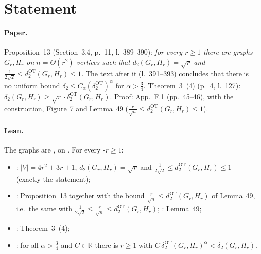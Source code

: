 

\paperversion

\section{Statement}

\paragraph{Paper.} Proposition~13 (Section~3.4, p.~11, l.~389--390): \emph{for every $r\ge1$ there are graphs
$G_r,H_r$ on $n=\Theta(r^2)$ vertices such that $d_2(G_r,H_r)=\sqrt r$ and
$\frac1{2\sqrt2}\le d^{\mathrm{OT}}_2(G_r,H_r)\le1$.} The text after it (l.~391--393) concludes that there is no
uniform bound $\delta_2\le C_\alpha(\delta^{\mathrm{OT}}_2)^\alpha$ for $\alpha>\frac34$. Theorem~3~(4) (p.~4,
l.~127): $\delta_2(G_r,H_r)\ge\sqrt r\cdot\delta^{\mathrm{OT}}_2(G_r,H_r)$. Proof: App.~F.1 (pp.~45--46), with the
construction, Figure~7 and Lemma~49 ($\frac r{\sqrt n}\le d^{\mathrm{OT}}_2(G_r,H_r)\le1$).

\paragraph{Lean.} The graphs are ,  on . For every
\hyp{$r\ge1$}:
\begin{itemize}
\item {}: $|V|=4r^2+3r+1$, $d_2(G_r,H_r)=\sqrt r$ and $\frac1{2\sqrt2}\le d^{\mathrm{OT}}_2(G_r,H_r)\le1$
  (exactly the statement);
\item {}: Proposition~13 together with the bound $\frac r{\sqrt n}\le d^{\mathrm{OT}}_2(G_r,H_r)$
  of Lemma~49, i.e.\ the same with $\frac1{2\sqrt2}\le\frac r{\sqrt n}\le d^{\mathrm{OT}}_2(G_r,H_r)$;
  : Lemma~49;
\item {}: Theorem~3~(4);
\item {}: for all $\alpha>\frac34$ and $C\in\mathbb R$ there is $r\ge1$ with
  $C\,\delta^{\mathrm{OT}}_2(G_r,H_r)^\alpha<\delta_2(G_r,H_r)$.
\end{itemize}

